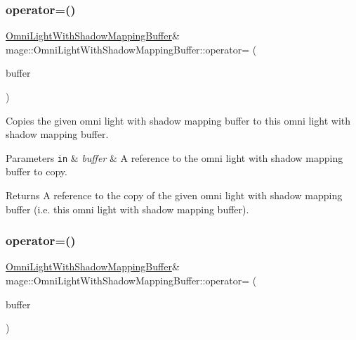 \subsubsection{\texorpdfstring{operator=()}{operator=()}\hspace{0.1cm}{\footnotesize\ttfamily [1/2]}}
{\footnotesize\ttfamily \hyperlink{structmage_1_1_omni_light_with_shadow_mapping_buffer}{Omni\+Light\+With\+Shadow\+Mapping\+Buffer}\& mage\+::\+Omni\+Light\+With\+Shadow\+Mapping\+Buffer\+::operator= (\begin{DoxyParamCaption}\item[{const \hyperlink{structmage_1_1_omni_light_with_shadow_mapping_buffer}{Omni\+Light\+With\+Shadow\+Mapping\+Buffer} \&}]{buffer }\end{DoxyParamCaption})\hspace{0.3cm}{\ttfamily [default]}}

Copies the given omni light with shadow mapping buffer to this omni light with shadow mapping buffer.


\begin{DoxyParams}[1]{Parameters}
\mbox{\tt in}  & {\em buffer} & A reference to the omni light with shadow mapping buffer to copy. \\
\hline
\end{DoxyParams}
\begin{DoxyReturn}{Returns}
A reference to the copy of the given omni light with shadow mapping buffer (i.\+e. this omni light with shadow mapping buffer). 
\end{DoxyReturn}
\hypertarget{structmage_1_1_omni_light_with_shadow_mapping_buffer_ad7801e067fde2f54f0c328b2e34ed118}{}\label{structmage_1_1_omni_light_with_shadow_mapping_buffer_ad7801e067fde2f54f0c328b2e34ed118} 
\subsubsection{\texorpdfstring{operator=()}{operator=()}\hspace{0.1cm}{\footnotesize\ttfamily [2/2]}}
{\footnotesize\ttfamily \hyperlink{structmage_1_1_omni_light_with_shadow_mapping_buffer}{Omni\+Light\+With\+Shadow\+Mapping\+Buffer}\& mage\+::\+Omni\+Light\+With\+Shadow\+Mapping\+Buffer\+::operator= (\begin{DoxyParamCaption}\item[{\hyperlink{structmage_1_1_omni_light_with_shadow_mapping_buffer}{Omni\+Light\+With\+Shadow\+Mapping\+Buffer} \&\&}]{buffer }\end{DoxyParamCaption})\hspace{0.3cm}{\ttfamily [default]}}

